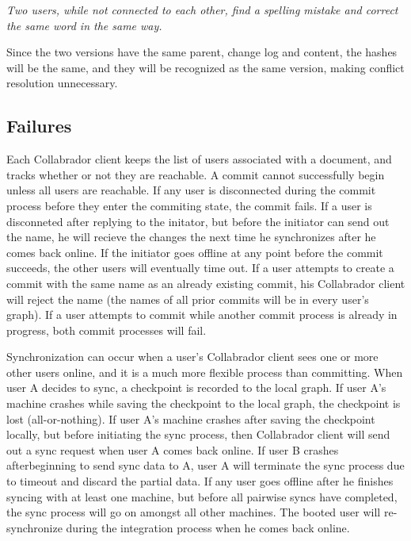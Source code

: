 \documentclass[11pt,titlepage]{article}
\begin{document}
\vspace{5mm}
\noindent
\emph{Two users, while not connected to each other, find a spelling
  mistake and correct the same word in the same way.}

\vspace{5mm}

Since the two versions have the same parent, change log and content,
the hashes will be the same, and they will be recognized as the same
version, making conflict resolution unnecessary.

\subsection{Failures}

Each Collabrador client keeps the list of users associated with a
document, and tracks whether or not they are reachable. A commit
cannot successfully begin unless all users are reachable. If any user
is disconnected during the commit process before they enter the
commiting state, the commit fails. If a user is disconneted after
replying to the initator, but before the initiator can send out the
name, he will recieve the changes the next time he synchronizes after
he comes back online. If the initiator goes offline at any point
before the commit succeeds, the other users will eventually time out.
If a user attempts to create a commit with the same name as an already
existing commit, his Collabrador client will reject the name (the
names of all prior commits will be in every user's graph). If a user
attempts to commit while another commit process is already in
progress, both commit processes will fail.

Synchronization can occur when a user's Collabrador client sees one or
more other users online, and it is a much more flexible process than
committing.  When user A decides to sync, a checkpoint is recorded to
the local graph.  If user A's machine crashes while saving the
checkpoint to the local graph, the checkpoint is lost
(all-or-nothing). If user A's machine crashes after saving the
checkpoint locally, but before initiating the sync process, then
Collabrador client will send out a sync request when user A comes back
online.  If user B crashes afterbeginning to send sync data to A, user
A will terminate the sync process due to timeout and discard the
partial data. If any user goes offline after he finishes syncing with
at least one machine, but before all pairwise syncs have completed,
the sync process will go on amongst all other machines. The booted
user will re-synchronize during the integration process when he comes
back online.
\end{document}
